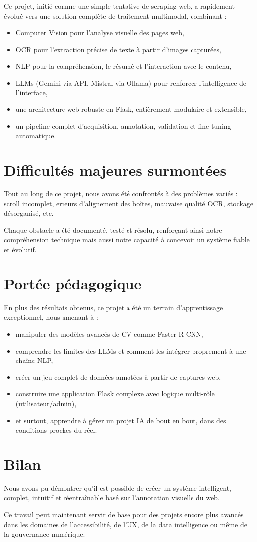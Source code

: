 \documentclass[12pt,a4paper]{report}
\begin{document}
Ce projet, initié comme une simple tentative de scraping web, a rapidement évolué vers une solution complète de traitement multimodal, combinant :
\begin{itemize}
\item Computer Vision pour l'analyse visuelle des pages web,
\item OCR pour l'extraction précise de texte à partir d'images capturées,
\item NLP pour la compréhension, le résumé et l'interaction avec le contenu,
\item LLMs (Gemini via API, Mistral via Ollama) pour renforcer l'intelligence de l'interface,
\item une architecture web robuste en Flask, entièrement modulaire et extensible,
\item un pipeline complet d'acquisition, annotation, validation et fine-tuning automatique.
\end{itemize}

\section{Difficultés majeures surmontées}

Tout au long de ce projet, nous avons été confrontés à des problèmes variés :
scroll incomplet, erreurs d'alignement des boîtes, mauvaise qualité OCR, stockage désorganisé, etc.

Chaque obstacle a été documenté, testé et résolu, renforçant ainsi notre compréhension technique mais aussi notre capacité à concevoir un système fiable et évolutif.

\section{Portée pédagogique}

En plus des résultats obtenus, ce projet a été un terrain d'apprentissage exceptionnel, nous amenant à :
\begin{itemize}
\item manipuler des modèles avancés de CV comme Faster R-CNN,
\item comprendre les limites des LLMs et comment les intégrer proprement à une chaîne NLP,
\item créer un jeu complet de données annotées à partir de captures web,
\item construire une application Flask complexe avec logique multi-rôle (utilisateur/admin),
\item et surtout, apprendre à gérer un projet IA de bout en bout, dans des conditions proches du réel.
\end{itemize}

\section{Bilan}

Nous avons pu démontrer qu'il est possible de créer un système intelligent, complet, intuitif et réentraînable basé sur l'annotation visuelle du web.

Ce travail peut maintenant servir de base pour des projets encore plus avancés dans les domaines de l'accessibilité, de l'UX, de la data intelligence ou même de la gouvernance numérique.
\end{document}
